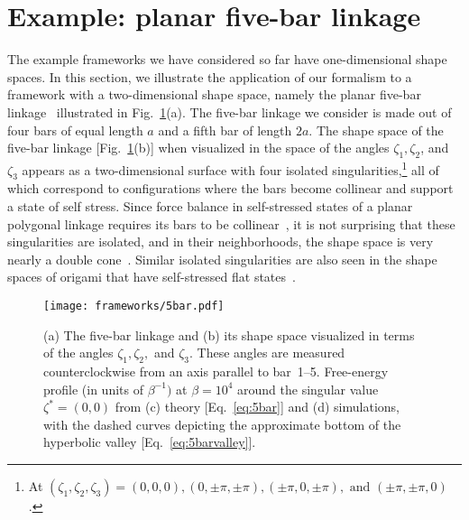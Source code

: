 \section{Example: planar five-bar linkage}
\label{sec:5bar}

The example frameworks we have considered so far have one-dimensional shape spaces.
In this section, we illustrate the application of our formalism to a framework with a two-dimensional shape space, namely the planar five-bar linkage~\cite{mermoud2000,curtis2007} illustrated in Fig.~\ref{fig:5bar}(a).
The five-bar linkage we consider is made out of four bars of equal length $a$ and a fifth bar of length $2a$.
The shape space of the five-bar linkage [Fig.~\ref{fig:5bar}(b)] when visualized in the space of the angles $\zeta_{1}, \zeta_{2}$, and $\zeta_{3}$ appears as a two-dimensional surface with four isolated singularities,\footnote{At $(\zeta_{1}, \zeta_{2}, \zeta_{3}) = (0, 0, 0), (0, \pm\pi, \pm\pi), (\pm\pi, 0, \pm\pi), \text{ and } (\pm\pi, \pm\pi, 0)$.} all of which correspond to configurations where the bars become collinear and support a state of self stress.
Since force balance in self-stressed states of a planar polygonal linkage requires its bars to be collinear~\cite{farber2008}, it is not surprising that these singularities are isolated, and in their neighborhoods, the shape space is very nearly a double cone~\cite{kapovich1995,mermoud2000}.
Similar isolated singularities are also seen in the shape spaces of origami that have self-stressed flat states~\cite{berry2020}.
%
\begin{figure}
  \begin{center}
    \texttt{[image: frameworks/5bar.pdf]}
  \end{center}
  \caption{(a) The five-bar linkage and (b) its shape space visualized in terms of the angles $\zeta_{1}, \zeta_{2},$ and $\zeta_{3}$.  These angles are measured counterclockwise from an axis parallel to bar~1--5.  Free-energy profile (in units of $\beta^{-1})$ at $\beta = 10^{4}$ around the singular value $\zeta^{*} = (0, 0)$ from (c) theory [Eq.~\eqref{eq:5bar}] and (d) simulations, with the dashed curves depicting the approximate bottom of the hyperbolic valley [Eq.~\eqref{eq:5barvalley}].}
  \label{fig:5bar}
\end{figure}



